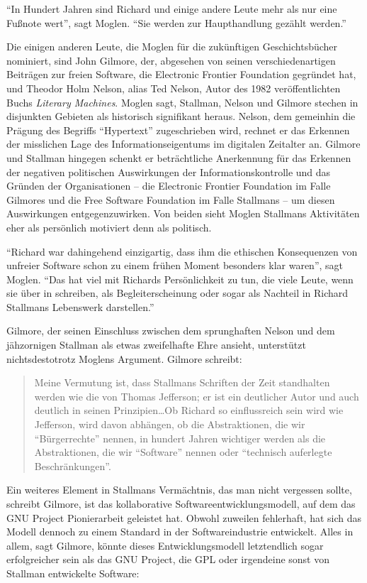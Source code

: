 "`In Hundert Jahren sind Richard und einige andere Leute mehr als nur eine Fußnote wert"', sagt Moglen. "`Sie werden zur Haupthandlung gezählt werden."'

Die einigen anderen Leute, die Moglen für die zukünftigen Geschichtsbücher nominiert, sind John Gilmore, der, abgesehen von seinen verschiedenartigen Beiträgen zur freien Software, die Electronic Frontier Foundation gegründet hat, und Theodor Holm Nelson, alias Ted Nelson, Autor des 1982 veröffentlichten Buchs \textit{Literary Machines}. Moglen sagt, Stallman, Nelson und Gilmore stechen in disjunkten Gebieten als historisch signifikant heraus. Nelson, dem gemeinhin die Prägung des Begriffs "`Hypertext"' zugeschrieben wird, rechnet er das Erkennen der misslichen Lage des Informationseigentums im digitalen Zeitalter an. Gilmore und Stallman hingegen schenkt er beträchtliche Anerkennung für das Erkennen der negativen politischen Auswirkungen der Informationskontrolle und das Gründen der Organisationen – die Electronic Frontier Foundation im Falle Gilmores und die Free Software Foundation im Falle Stallmans – um diesen Auswirkungen entgegenzuwirken. Von beiden sieht Moglen Stallmans Aktivitäten eher als persönlich motiviert denn als politisch.

"`Richard war dahingehend einzigartig, dass ihm die ethischen Konsequenzen von unfreier Software schon zu einem frühen Moment besonders klar waren"', sagt Moglen. "`Das hat viel mit Richards Persönlichkeit zu tun, die viele Leute, wenn sie über in schreiben, als Begleiterscheinung oder sogar als Nachteil in Richard Stallmans Lebenswerk darstellen."'

Gilmore, der seinen Einschluss zwischen dem sprunghaften Nelson und dem jähzornigen Stallman als etwas zweifelhafte Ehre ansieht, unterstützt nichtsdestotrotz Moglens Argument. Gilmore schreibt:

\begin{quote}
Meine Vermutung ist, dass Stallmans Schriften der Zeit standhalten werden wie die von Thomas Jefferson; er ist ein deutlicher Autor und auch deutlich in seinen Prinzipien\ldots Ob Richard so einflussreich sein wird wie Jefferson, wird davon abhängen, ob die Abstraktionen, die wir "`Bürgerrechte"' nennen, in hundert Jahren wichtiger werden als die Abstraktionen, die wir "`Software"' nennen oder "`technisch auferlegte Beschränkungen"'.
\end{quote}

Ein weiteres Element in Stallmans Vermächtnis, das man nicht vergessen sollte, schreibt Gilmore, ist das kollaborative Softwareentwicklungsmodell, auf dem das GNU Project  Pionierarbeit geleistet hat. Obwohl zuweilen fehlerhaft, hat sich das Modell dennoch zu einem Standard in der Softwareindustrie entwickelt. Alles in allem, sagt Gilmore, könnte dieses Entwicklungsmodell letztendlich sogar erfolgreicher sein als das GNU Project, die GPL oder irgendeine sonst von Stallman entwickelte Software:

